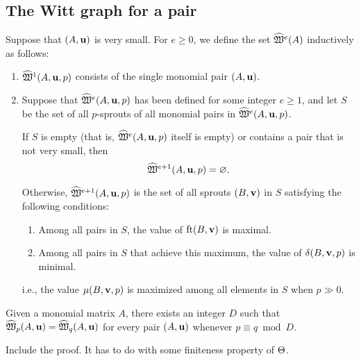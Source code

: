 \documentclass[11pt]{amsart}
\begin{document}
\subsection{The Witt graph for a pair}
\begin{definition}
Suppose that $(A, \mathbf{u})$ is very small.  For $e \geq 0$, we define the set $\widehat{\mathfrak{W}}^e(A)$ inductively as follows:
\begin{enumerate}
\item $\widehat{\mathfrak{W}}^1(A, \mathbf{u}, p)$ consists of the single monomial pair $(A, \mathbf{u})$.
\item Suppose that $\widehat{\mathfrak{W}}^e(A, \mathbf{u}, p)$ has been defined for some integer $e \geq 1$, and let $S$ be the set of all $p$-sprouts of all monomial pairs in $\widehat{\mathfrak{W}}^e(A, \mathbf{u}, p)$.


If  $S$ is empty (that is, $\widehat{\mathfrak{W}}^e(A, \mathbf{u}, p)$ itself is empty) or contains a pair that is not very small, then \[ \widehat{\mathfrak{W}}^{e+1}(A, \mathbf{u}, p) = \varnothing.\]  

Otherwise, $\widehat{\mathfrak{W}}^{e+1}(A, \mathbf{u}, p)$ is the set of all sprouts $(B, \mathbf{v})$ in $S$ satisfying the following conditions:    

\begin{enumerate}
\item Among all pairs in $S$, the value of  $\operatorname{ft}(B, \mathbf{v})$ is maximal.
\item Among all pairs in $S$ that achieve this maximum, the value of $\delta(B, \mathbf{v}, p)$ is minimal.
\end{enumerate}
i.e., the value $\mu(B, \mathbf{v},p)$ is maximized among all elements in $S$ when $p \gg 0$. 
\end{enumerate}
\end{definition}


\begin{proposition}
Given a monomial matrix $A$, there exists an integer $D$ such that $\widehat{\mathfrak{W}}_p(A, \mathbf{u}) = \widehat{\mathfrak{W}}_q(A, \mathbf{u})$ for every pair $(A, \mathbf{u})$ whenever $p \equiv q \bmod D$.
\end{proposition}

\alert[inline]{Include the proof.  It has to do with some finiteness property of $\Theta$.}


\end{document}
